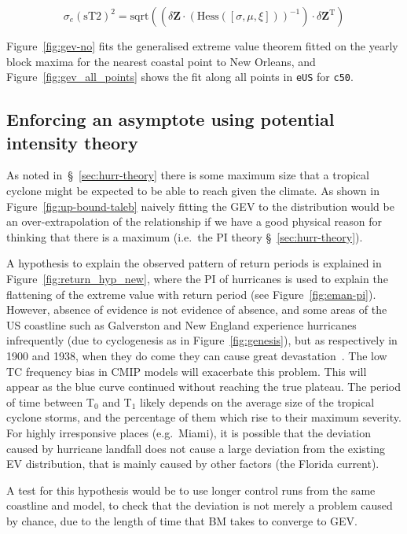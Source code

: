 \begin{equation}
\sigma_e(\mathrm{sT2})^{2} = \mathrm{sqrt}\left((\delta \mathbf{Z} \cdot \left( \mathrm{Hess}([\sigma, \mu, \xi]) \right)^{-1} ) \cdot  \delta \mathbf{Z}^{\mathrm{T}}\right)
\end{equation}

Figure~\ref{fig:gev-no} fits the generalised extreme value theorem fitted
on the yearly block maxima for the nearest coastal point to New Orleans,
and Figure~\ref{fig:gev_all_points} shows the fit along all points in \texttt{eUS}
for \texttt{c50}.

\subsection{Enforcing an asymptote using potential intensity theory }
\label{sec:evt-limit}

As noted in~§~\ref{sec:hurr-theory} there is some maximum size
that a tropical cyclone might be expected to be able to reach given
the climate.
As shown in Figure~\ref{fig:up-bound-taleb} naively fitting
the GEV to the distribution would be an over-extrapolation of
the relationship if we have a good physical reason for
thinking that there is a maximum
(i.e.~the PI theory §~\ref{sec:hurr-theory}).

A hypothesis to explain the observed pattern of return periods is explained in
Figure~\ref{fig:return_hyp_new}, where the PI of hurricanes is used to
explain the flattening of the extreme
value with return period (see Figure~\ref{fig:eman-pi}).
However, absence of evidence is not
 evidence of absence, and some areas of the US
coastline such as Galverston and New England experience hurricanes infrequently
(due to cyclogenesis as in Figure~\ref{fig:genesis}),
but as respectively in 1900 and 1938,
when they do come they can cause great devastation~\cite{emanuel2005divine}.
The low TC frequency bias in CMIP models will exacerbate this problem.
This will appear as the blue curve continued without reaching the true plateau.
The period of time between T$_0$ and T$_1$ likely depends
 on the average size of the tropical cyclone storms,
and the percentage of them which rise to their maximum severity.
For highly irresponsive places (e.g.~Miami),
 it is possible that the deviation caused
by hurricane landfall does not cause a large
deviation from the existing EV distribution,
that is mainly caused by other factors (the Florida current).

A test for this hypothesis would be to use longer control runs from the same
coastline and model, to check that the deviation is not merely a problem caused
by chance, due to the length of time that BM takes to converge to GEV.









\FloatBarrier
